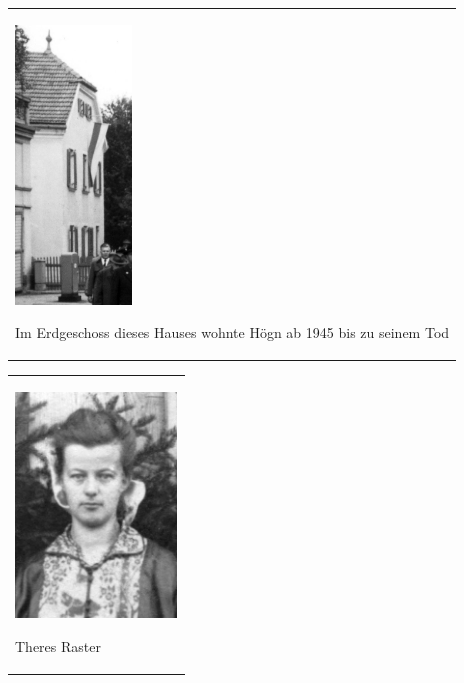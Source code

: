 \begin{center}
\begin{minipage}{3.491cm}
\begin{flushleft}
\tablefirsthead{}
\tablehead{}
\tabletail{}
\tablelasttail{}
\begin{supertabular}{m{3.291cm}}

\includegraphics[width=3.108cm,height=7.408cm]{pictures/zulassungsarbeit-img038.jpg}

Im Erdgeschoss dieses Hauses wohnte
Högn ab 1945 bis zu seinem Tod\\
\end{supertabular}
\end{flushleft}
\end{minipage}
\end{center}
\begin{flushleft}
\tablefirsthead{}
\tablehead{}
\tabletail{}
\tablelasttail{}
\begin{supertabular}{m{4.6330004cm}}

\begin{center}

\includegraphics[width=4.3cm,height=5.973cm]{pictures/zulassungsarbeit-img039.jpg}

\end{center}
Theres Raster\\
\end{supertabular}
\end{flushleft}
